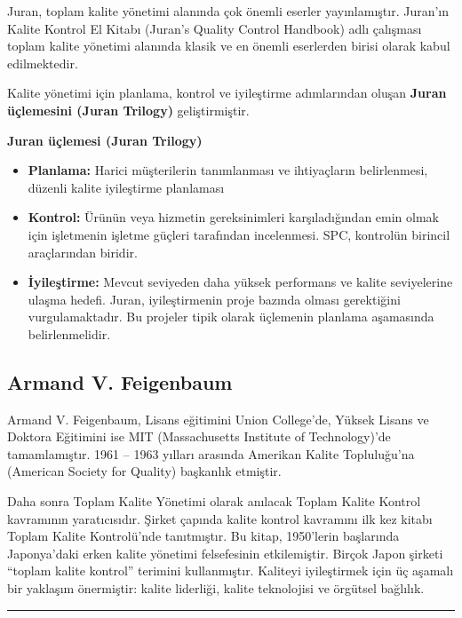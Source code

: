 \documentclass[
]{book}
\begin{document}
Juran, toplam kalite yönetimi alanında çok önemli eserler yayınlamıştır. Juran'ın Kalite Kontrol El Kitabı (Juran's Quality Control Handbook) adlı çalışması toplam kalite yönetimi alanında klasik ve en önemli eserlerden birisi olarak kabul edilmektedir.

Kalite yönetimi için planlama, kontrol ve iyileştirme adımlarından oluşan \textbf{Juran üçlemesini (Juran Trilogy)} geliştirmiştir.

\textbf{Juran üçlemesi (Juran Trilogy)}

\begin{itemize}
\item
  \textbf{Planlama:} Harici müşterilerin tanımlanması ve ihtiyaçların belirlenmesi, düzenli kalite iyileştirme planlaması
\item
  \textbf{Kontrol:} Ürünün veya hizmetin gereksinimleri karşıladığından emin olmak için işletmenin işletme güçleri tarafından incelenmesi. SPC, kontrolün birincil araçlarından biridir.
\item
  \textbf{İyileştirme:} Mevcut seviyeden daha yüksek performans ve kalite seviyelerine ulaşma hedefi. Juran, iyileştirmenin proje bazında olması gerektiğini vurgulamaktadır. Bu projeler tipik olarak üçlemenin planlama aşamasında belirlenmelidir.
\end{itemize}

\hypertarget{armand-v.-feigenbaum}{%
\subsection{Armand V. Feigenbaum}\label{armand-v.-feigenbaum}}

Armand V. Feigenbaum, Lisans eğitimini Union College'de, Yüksek Lisans ve Doktora Eğitimini ise MIT (Massachusetts Institute of Technology)'de tamamlamıştır. 1961 -- 1963 yılları arasında Amerikan Kalite Topluluğu'na (American Society for Quality) başkanlık etmiştir.

Daha sonra Toplam Kalite Yönetimi olarak anılacak Toplam Kalite Kontrol kavramının yaratıcısıdır. Şirket çapında kalite kontrol kavramını ilk kez kitabı Toplam Kalite Kontrolü'nde tanıtmıştır. Bu kitap, 1950'lerin başlarında Japonya'daki erken kalite yönetimi felsefesinin etkilemiştir. Birçok Japon şirketi ``toplam kalite kontrol'' terimini kullanmıştır. Kaliteyi iyileştirmek için üç aşamalı bir yaklaşım önermiştir: kalite liderliği, kalite teknolojisi ve örgütsel bağlılık.

\begin{center}\rule{0.5\linewidth}{0.5pt}\end{center}
\end{document}
